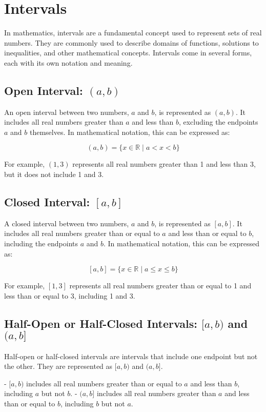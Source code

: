 \section{Intervals}

In mathematics, intervals are a fundamental concept used to represent sets of real numbers. They are commonly used to describe domains of functions, solutions to inequalities, and other mathematical concepts. Intervals come in several forms, each with its own notation and meaning.

\subsection{Open Interval: $(a, b)$}

An open interval between two numbers, $a$ and $b$, is represented as $(a, b)$. It includes all real numbers greater than $a$ and less than $b$, excluding the endpoints $a$ and $b$ themselves. In mathematical notation, this can be expressed as:

$$(a, b) = \{x \in \mathbb{R} \mid a < x < b\}$$

For example, $(1, 3)$ represents all real numbers greater than 1 and less than 3, but it does not include 1 and 3.

\subsection{Closed Interval: $[a, b]$}

A closed interval between two numbers, $a$ and $b$, is represented as $[a, b]$. It includes all real numbers greater than or equal to $a$ and less than or equal to $b$, including the endpoints $a$ and $b$. In mathematical notation, this can be expressed as:

$$[a, b] = \{x \in \mathbb{R} \mid a \leq x \leq b\}$$

For example, $[1, 3]$ represents all real numbers greater than or equal to 1 and less than or equal to 3, including 1 and 3.

\subsection{Half-Open or Half-Closed Intervals: $[a, b)$ and $(a, b]$}

Half-open or half-closed intervals are intervals that include one endpoint but not the other. They are represented as $[a, b)$ and $(a, b]$.

- $[a, b)$ includes all real numbers greater than or equal to $a$ and less than $b$, including $a$ but not $b$.
- $(a, b]$ includes all real numbers greater than $a$ and less than or equal to $b$, including $b$ but not $a$.

